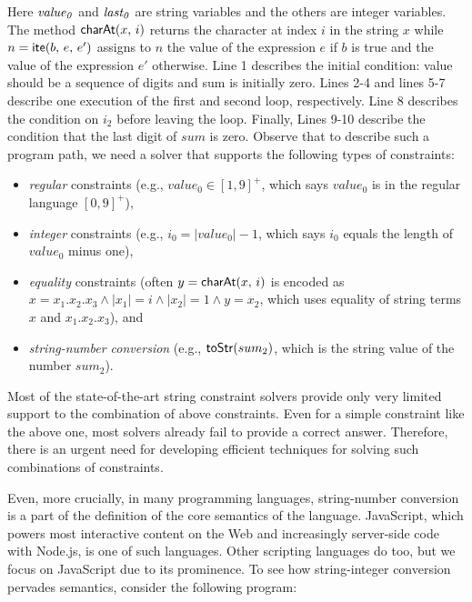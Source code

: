 \documentclass[sigplan,review,anonymous]{acmart}\settopmatter{printfolios=true,printccs=false,printacmref=false}
\begin{document}
Here ${\it value_0}$ and ${\it last_0}$ are string variables and the others are integer variables. The method $\mbox{\textsf{charAt}($x$, $i$)}$ returns the character at index $i$ in the string $x$ while $n=\mbox{\textsf{ite}($b$, $e$, $e'$)}$ assigns to $n$ the value of the expression $e$ if $b$ is true and the value of the expression $e'$ otherwise. Line 1 describes the initial condition: \textsf{value} should be a sequence of digits and \textsf{sum} is initially zero. Lines 2-4 and lines 5-7 describe one execution of the first and second loop, respectively. Line 8 describes the condition on $i_2$ before leaving the loop. Finally, Lines 9-10 describe the condition that the last digit of $sum$ is zero. Observe that to describe such a program path, we need a solver that supports the following types of constraints:
\begin{itemize}
	\item \emph{regular} constraints (e.g., $value_0 \in [1,9]^+$, which says $value_0$ is in the regular language $[0,9]^+$),
	\item \emph{integer} constraints (e.g., $i_0 = |value_0| -1$, which says $i_0$ equals the length of $value_0$ minus one),
	\item \emph{equality} constraints (often $y=\mbox{\textsf{charAt}($x$, $i$)}$ is encoded as $x=x_1.x_2.x_3 \wedge |x_1| = i \wedge |x_2| =1 \wedge y= x_2$, which uses equality of string terms $x$ and $x_1.x_2.x_3$), and
	\item \emph{string-number conversion} (e.g., $\mbox{\textsf{toStr}($sum_2$)}$, which is the string value of the number $sum_2$).
\end{itemize}


Most of the state-of-the-art string constraint solvers provide only very limited support to the combination of above constraints. Even for a simple constraint like the above one, most solvers already fail to provide a correct answer. Therefore, there is an urgent  need for developing efficient techniques for solving such combinations of constraints. 




Even, more crucially, in many programming languages, string-number conversion is a part of the definition of the core semantics of the language. 
 JavaScript, which powers most interactive content on the Web and increasingly server-side code with Node.js, is one of such languages. Other scripting languages do too, but we focus on JavaScript due to its prominence. To see how string-integer conversion pervades semantics, consider the following program:
\end{document}
